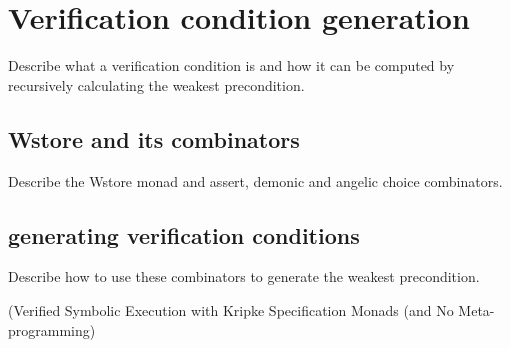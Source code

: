 \documentclass[]{article}
\begin{document}
\section{Verification condition generation}
Describe what a verification condition is and how it can be computed by recursively calculating the weakest precondition.

\subsection{Wstore and its combinators}
Describe the Wstore monad and assert, demonic and angelic choice combinators.
\subsection{generating verification conditions}
Describe how to use these combinators to generate the weakest precondition.



(Verified Symbolic Execution with Kripke Specification
Monads (and No Meta-programming)
\end{document}
